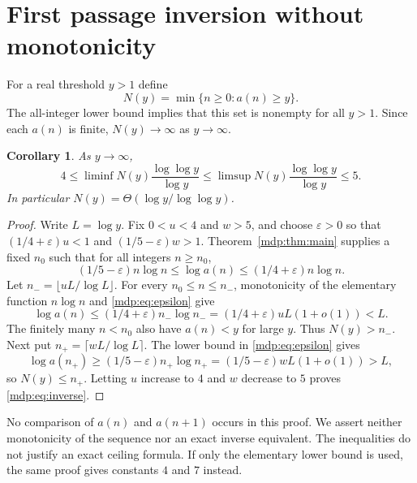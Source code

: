 \documentclass[11pt,letterpaper]{article}
\numberwithin{equation}{section}
\newtheorem{corollary}[theorem]{Corollary}
\theoremstyle{remark}\newtheorem{remark}[theorem]{Remark}
\begin{document}
\section{First passage inversion without monotonicity}
For a real threshold $y>1$ define
\[
 N(y)=\min\{n\ge0:a(n)\ge y\}.
\]
The all-integer lower bound implies that this set is nonempty for all
$y>1$. Since each $a(n)$ is finite, $N(y)\to\infty$ as $y\to\infty$.

\begin{corollary}\label{mdp:cor:inverse}
As $y\to\infty$,
\begin{equation}\label{mdp:eq:inverse}
 4\le\liminf N(y)\frac{\log\log y}{\log y}
 \le\limsup N(y)\frac{\log\log y}{\log y}\le5.
\end{equation}
In particular $N(y)=\Theta(\log y/\log\log y)$.
\end{corollary}
\begin{proof}
Write $L=\log y$. Fix $0<u<4$ and $w>5$, and choose $\varepsilon>0$
so that $(1/4+\varepsilon)u<1$ and $(1/5-\varepsilon)w>1$.
Theorem~\ref{mdp:thm:main} supplies a fixed $n_0$ such that for all
integers $n\ge n_0$,
\begin{equation}\label{mdp:eq:epsilon}
 (1/5-\varepsilon)n\log n\le\log a(n)
 \le(1/4+\varepsilon)n\log n.
\end{equation}
Let $n_- =\lfloor uL/\log L\rfloor$. For every
$n_0\le n\le n_-$, monotonicity of the elementary function $n\log n$
and \eqref{mdp:eq:epsilon} give
\[
 \log a(n)\le(1/4+\varepsilon)n_-\log n_-
 =(1/4+\varepsilon)uL(1+o(1))<L.
\]
The finitely many $n<n_0$ also have $a(n)<y$ for large $y$.
Thus $N(y)>n_-$. Next put $n_+=\lceil wL/\log L\rceil$.
The lower bound in \eqref{mdp:eq:epsilon} gives
\[
 \log a(n_+)\ge(1/5-\varepsilon)n_+\log n_+
 =(1/5-\varepsilon)wL(1+o(1))>L,
\]
so $N(y)\le n_+$. Letting $u$ increase to $4$ and $w$ decrease to $5$
proves \eqref{mdp:eq:inverse}.
\end{proof}
No comparison of $a(n)$ and $a(n+1)$ occurs in this proof. We assert
neither monotonicity of the sequence nor an exact inverse equivalent.
The inequalities do not justify an exact ceiling formula. If only the
elementary lower bound is used, the same proof gives constants $4$
and $7$ instead.
\end{document}
